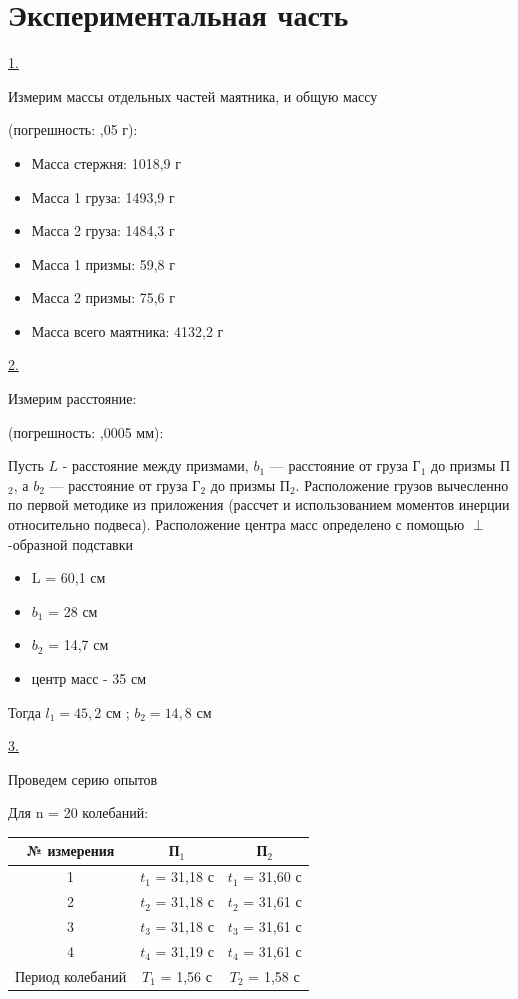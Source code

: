\documentclass{article}
\begin{document}
\section*{Экспериментальная часть}
\underline{1.}

\noindent
Измерим массы отдельных частей маятника, и общую массу 

\noindent
(погрешность: ,05 г):

\begin{itemize}
    \item Масса стержня: 1018,9 г
    \item Масса 1 груза: 1493,9 г
    \item Масса 2 груза: 1484,3 г
    \item Масса 1 призмы: 59,8 г
    \item Масса 2 призмы: 75,6 г
    \item Масса всего маятника: 4132,2 г
\end{itemize}


\noindent
\underline{2.}

\noindent
Измерим расстояние: 

\noindent
(погрешность: ,0005 мм):

\noindent
Пусть $L$ - расстояние между призмами, $b_1$ — расстояние от груза Г$_1$ до призмы П$_2$, а $b_2$ — расстояние от груза Г$_2$ до призмы П$_2$. Расположение грузов вычесленно по первой методике из приложения (рассчет и использованием моментов инерции относительно подвеса). Расположение центра масс определено с помощью $\perp$-образной подставки 

\begin{itemize}
    \item L = 60,1 см
    \item $b_1$ = 28 см
    \item $b_2$ = 14,7 см
    \item центр масс - 35 см
\end{itemize}

\noindent
Тогда $l_1=45,2$ см ; $b_2=14,8$ см

\newpage

\noindent
\underline{3.}

\noindent
Проведем серию опытов 

\noindent
Для n = 20 колебаний: 


\begin{table}[th!]
    \centering
    \begin{tabular}{|c|c|c|}
    \hline
         № измерения & П$_1$ & П$_2$\\
    
    \hline
        1  & $t_1$ = 31,18 с & $t_1$ = 31,60 с\\
        2  & $t_2$ = 31,18 с & $t_2$ = 31,61 с\\
        3  & $t_3$ = 31,18 с & $t_3$ = 31,61 с\\
        4  & $t_4$ = 31,19 с & $t_4$ = 31,61 с\\
    \hline
        Период колебаний  & $T_1$ = 1,56 с & $T_2$ = 1,58 с\\
    \hline
    \end{tabular}
    \label{tab:my_label}
\end{table}
\end{document}
